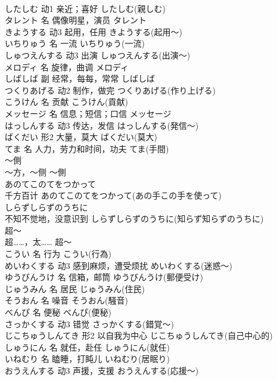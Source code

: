 \documentclass[8pt]{extreport}
\begin{document}
\begin{CJK}{UTF8}{min}
\\	したしむ	动1	亲近；喜好	したしむ(親しむ)	
\\	タレント	名	偶像明星，演员	タレント	
\\	きようする	动3	起用，任用	きようする(起用～)	
\\	いちりゅう	名	一流	いちりゅう(一流)	
\\	しゅつえんする	动3	出演	しゅつえんする(出演～)	
\\	メロディ	名	旋律，曲调	メロディ	
\\	しばしば	副	经常，每每，常常	しばしば	
\\	つくりあげる	动2	制作，做完	つくりあげる(作り上げる)	
\\	こうけん	名	贡献	こうけん(貢献)	
\\	メッセージ	名	信息；短信；口信	メッセージ	
\\	はっしんする	动3	传达，发信	はっしんする(発信～)	
\\	ばくだい	形2	大量，莫大	ばくだい(莫大)	
\\	てま	名	人力，劳力和时间，功夫	てま(手間)	
\\	～側	
\\	～方，～侧	～側	
\\	あのてこのてをつかって	
\\	千方百计	あのてこのてをつかって(あの手この手を使って)	
\\	しらずしらずのうちに	
\\	不知不觉地，没意识到	しらずしらずのうちに(知らず知らずのうちに)	
\\	超～	
\\	超……，太……	超～	
\\	こうい	名	行为	こうい(行為)	
\\	めいわくする	动3	感到麻烦，遭受烦扰	めいわくする(迷惑～)	
\\	ゆうびんうけ	名	信箱，邮筒	ゆうびんうけ(郵便受け)	
\\	じゅうみん	名	居民	じゅうみん(住民)	
\\	そうおん	名	噪音	そうおん(騒音)	
\\	べんぴ	名	便秘	べんぴ(便秘)	
\\	さっかくする	动3	错觉	さっかくする(錯覚～)	
\\	じこちゅうしんてき	形2	以自我为中心	じこちゅうしんてき(自己中心的)	
\\	しゅうにん	名	就任，赴任	しゅうにん(就任)	
\\	いねむり	名	瞌睡，打盹儿	いねむり(居眠り)	
\\	おうえんする	动3	声援，支援	おうえんする(応援～)	

\end{CJK}
\end{document}
